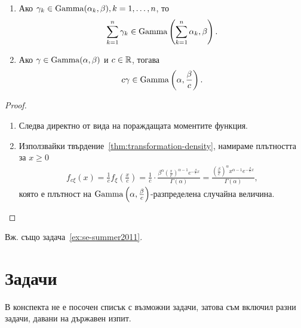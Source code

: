\documentclass[numbers=endperiod, bibliography=totocnumbered]{scrartcl}
\begin{document}
\begin{proposition}\label{thm:gamma-operations}
  \mbox{}
  \begin{enumerate}
    \item Ако \( \gamma_k \in \operatorname{Gamma}(\alpha_k, \beta), k = 1, \ldots, n \), то
    \begin{align*}
      \sum_{k=1}^n \gamma_k \in \operatorname{Gamma}\left( \sum_{k=1}^n \alpha_k, \beta \right).
    \end{align*}

    \item Ако \( \gamma \in \operatorname{Gamma}(\alpha, \beta) \) и \( c \in \mathbb{R} \), тогава
    \begin{align*}
      c \gamma \in \operatorname{Gamma}\left(\alpha, \frac \beta c \right).
    \end{align*}
  \end{enumerate}
\end{proposition}
\begin{proof}
  \mbox{}
  \begin{enumerate}
    \item Следва директно от вида на пораждащата моментите функция.
    \item Използвайки твърдение~\ref{thm:transformation-density}, намираме плътността за \( x \geq 0 \)
    \begin{align*}
      f_{c\xi}(x)
      =
      \frac 1 c f_\xi\left(\frac x c \right)
      =
      \frac 1 c \cdot \frac {\beta^\alpha {\left(\frac x c \right)}^{\alpha-1} e^{-\frac \beta c x}} {\Gamma(\alpha)}
      =
      \frac {{\left(\frac \beta c \right)}^\alpha x^{\alpha-1} e^{-\frac \beta c x}} {\Gamma(\alpha)},
    \end{align*}
    която е плътност на \( \operatorname{Gamma}\left(\alpha, \frac \beta c \right) \)-разпределена случайна величина.
  \end{enumerate}
\end{proof}

Вж. също задача~\ref{ex:se-summer2011}.

\section{Задачи}

В конспекта не е посочен списък с възможни задачи, затова съм включил разни задачи, давани на държавен изпит.
\end{document}
